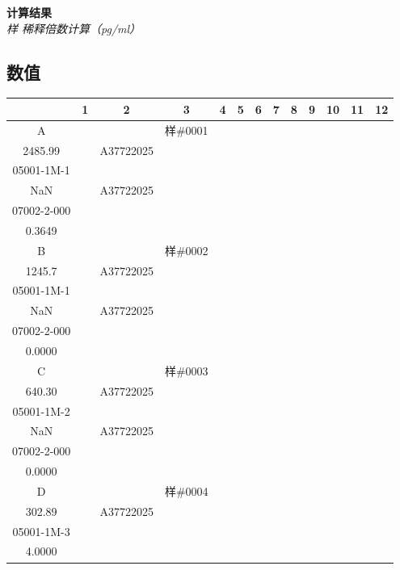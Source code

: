 \documentclass[UTF8,10pt,a4paper,fontset=fandol]{ctexart}
\newcommand{\fieldvalue}[1]{#1}
\begin{document}
\textbf{计算结果}\\
\textit{样 稀释倍数计算（pg/ml）}

\subsection{数值}

\begin{tabular}{c|*{12}{c|}}
 &1&2&3&4&5&6&7&8&9&10&11&12\\ \hline
A&&&%
\fieldvalue{\scriptsize 样\#0001\\2485.99}&
&%
\fieldvalue{\scriptsize A37722025\\05001-1M-1\\NaN}&
&%
\fieldvalue{\scriptsize A37722025\\07002-2-000\\0.3649}&
&&&&\\ \hline
B&&&%
\fieldvalue{\scriptsize 样\#0002\\1245.7}&
&%
\fieldvalue{\scriptsize A37722025\\05001-1M-1\\NaN}&
&%
\fieldvalue{\scriptsize A37722025\\07002-2-000\\0.0000}&
&&&&\\ \hline
C&&&%
\fieldvalue{\scriptsize 样\#0003\\640.30}&
&%
\fieldvalue{\scriptsize A37722025\\05001-1M-2\\NaN}&
&%
\fieldvalue{\scriptsize A37722025\\07002-2-000\\0.0000}&
&&&&\\ \hline
D&&&%
\fieldvalue{\scriptsize 样\#0004\\302.89}&
&%
\fieldvalue{\scriptsize A37722025\\05001-1M-3\\4.0000}&

\end{tabular}
\end{document}
